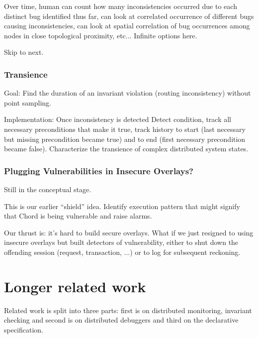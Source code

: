 \documentclass{sig-alt-full}
\begin{document}
{Over time, human can count how many inconsistencies occurred due to each
distinct bug identified thus far, can look at correlated occurrence of
different bugs causing inconsistencies, can look at spatial correlation
of bug occurrences among nodes in close topological proximity,
etc... Infinite options here.

Skip to next.



\subsubsection{Transience}
Goal: Find the duration of an invariant
violation (routing inconsistency) without point sampling.

Implementation: Once inconsistency is detected Detect condition, track
all necessary preconditions that make it true, track history to start
(last necessary but missing precondition became true) and to end (first
necessary precondition became false).  Characterize the transience of
complex distributed system states.


\subsubsection{Plugging Vulnerabilities in Insecure Overlays?}

Still in the conceptual stage.

This is our earlier ``shield'' idea.  Identify execution pattern that
might signify that Chord is being vulnerable and raise alarms.

Our thrust is: it's hard to build secure overlays. What if we just
resigned to using insecure overlays but built detectors of
vulnerability, either to shut down the offending session (request,
transaction, ...) or to log for subsequent reckoning.




\section{Longer related work}

Related work is split into three parts: first is on distributed monitoring, 
invariant checking and second is on distributed debuggers and third on the 
declarative specification.

\begin{itemize}


\end{itemize}}
\end{document}
